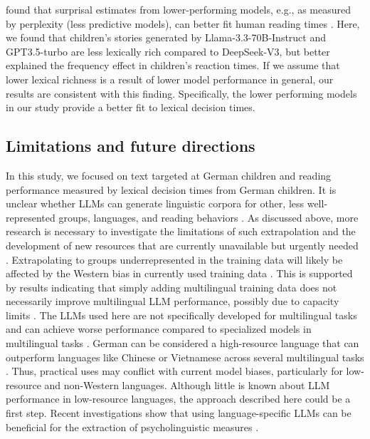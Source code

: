\documentclass[manuscript]{stjour}
\begin{document}
\citet{oh_frequency_2024} found that surprisal estimates from lower-performing models, e.g., as measured by perplexity (less predictive models), can better fit human reading times \citep[see also][]{boeve_systematic_2024}. Here, we found that children's stories generated by Llama-3.3-70B-Instruct and GPT3.5-turbo are less lexically rich compared to DeepSeek-V3, but better explained the frequency effect in children's reaction times. If we assume that lower lexical richness is a result of lower model performance in general, our results are consistent with this finding. Specifically, the lower performing models in our study provide a better fit to lexical decision times.  


\subsection*{Limitations and future directions}

In this study, we focused on text targeted at German children and reading performance measured by lexical decision times from German children. It is unclear whether LLMs can generate linguistic corpora for other, less well-represented groups, languages, and reading behaviors \citep[][]{gagl_eye_2022, blasi_over-reliance_2022}. As discussed above, more research is necessary to investigate the limitations of such extrapolation and the development of new resources that are currently unavailable but urgently needed \citep{henrich_weirdest_2010, blasi_over-reliance_2022}. Extrapolating to groups underrepresented in the training data will likely be affected by the Western bias in currently used training data \citep{atari_which_2023, rystrøm2025multilingualmulticulturalevaluating}. This is supported by results indicating that simply adding multilingual training data does not necessarily improve multilingual LLM performance, possibly due to capacity limits \citep{chang_when_2023}. The LLMs used here are not specifically developed for multilingual tasks and can achieve worse performance compared to specialized models in multilingual tasks \citep{lai_chatgpt_2023}. German can be considered a high-resource language that can outperform languages like Chinese or Vietnamese across several multilingual tasks \citep{lai_chatgpt_2023}. Thus, practical uses may conflict with current model biases, particularly for low-resource and non-Western languages. Although little is known about LLM performance in low-resource languages, the approach described here could be a first step. Recent investigations show that using language-specific LLMs can be beneficial for the extraction of psycholinguistic measures \citep{boeve_systematic_2024}. 
\end{document}
